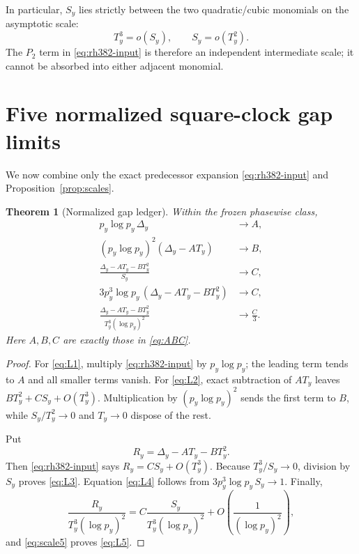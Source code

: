\documentclass[11pt]{article}
\newtheorem{theorem}{Theorem}[section]
\theoremstyle{definition}
\theoremstyle{remark}
\newcommand{\DeltaY}{\Delta_y}
\begin{document}
In particular, $S_y$ lies strictly between the two quadratic/cubic
monomials on the asymptotic scale:
\begin{equation}
 T_y^3=o(S_y),\qquad S_y=o(T_y^2).
 \label{eq:scale-order}
\end{equation}
The $P_2$ term in \eqref{eq:rh382-input} is therefore an independent
intermediate scale; it cannot be absorbed into either adjacent monomial.

\section{Five normalized square-clock gap limits}

We now combine only the exact predecessor expansion
\eqref{eq:rh382-input} and Proposition~\ref{prop:scales}.

\begin{theorem}[Normalized gap ledger]
\label{thm:gap-limits}
Within the frozen phasewise class,
\begin{align}
 p_y\log p_y\,\DeltaY&\longrightarrow A,
 \label{eq:L1}\\
 (p_y\log p_y)^2(\DeltaY-A T_y)&\longrightarrow B,
 \label{eq:L2}\\
 \frac{\DeltaY-A T_y-BT_y^2}{S_y}&\longrightarrow C,
 \label{eq:L3}\\
 3p_y^3\log p_y\,(\DeltaY-A T_y-BT_y^2)&\longrightarrow C,
 \label{eq:L4}\\
 \frac{\DeltaY-A T_y-BT_y^2}
 {T_y^3(\log p_y)^2}&\longrightarrow\frac C3.
 \label{eq:L5}
\end{align}
Here $A,B,C$ are exactly those in \eqref{eq:ABC}.
\end{theorem}

\begin{proof}
For \eqref{eq:L1}, multiply \eqref{eq:rh382-input} by
$p_y\log p_y$; the leading term tends to $A$ and all smaller terms vanish.
For \eqref{eq:L2}, exact subtraction of $AT_y$ leaves
$BT_y^2+CS_y+O(T_y^3)$.  Multiplication by
$(p_y\log p_y)^2$ sends the first term to $B$, while
$S_y/T_y^2\to0$ and $T_y\to0$ dispose of the rest.

Put
\begin{equation}
 R_y=\DeltaY-A T_y-BT_y^2.
 \label{eq:residual}
\end{equation}
Then \eqref{eq:rh382-input} says $R_y=CS_y+O(T_y^3)$.
Because $T_y^3/S_y\to0$, division by $S_y$ proves \eqref{eq:L3}.
Equation \eqref{eq:L4} follows from
$3p_y^3\log p_y\,S_y\to1$.  Finally,
\[
 \frac{R_y}{T_y^3(\log p_y)^2}
 =C\frac{S_y}{T_y^3(\log p_y)^2}
   +O\!\left(\frac{1}{(\log p_y)^2}\right),
\]
and \eqref{eq:scale5} proves \eqref{eq:L5}.
\end{proof}
\end{document}
